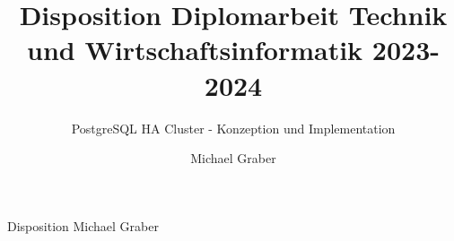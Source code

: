 \documentclass{grathesis}
\begin{document}
    \title{Disposition Diplomarbeit Technik und Wirtschaftsinformatik 2023-2024}
    \subtitle{PostgreSQL HA Cluster - Konzeption und Implementation} %
    \author{Michael Graber}

    \maketitle

    \begin{zusammenfassung}
        Disposition Michael Graber
    \end{zusammenfassung}


    \tableofcontents
    
    \startThesis %
    
    
    
    
    
    
    
    
\end{document}
